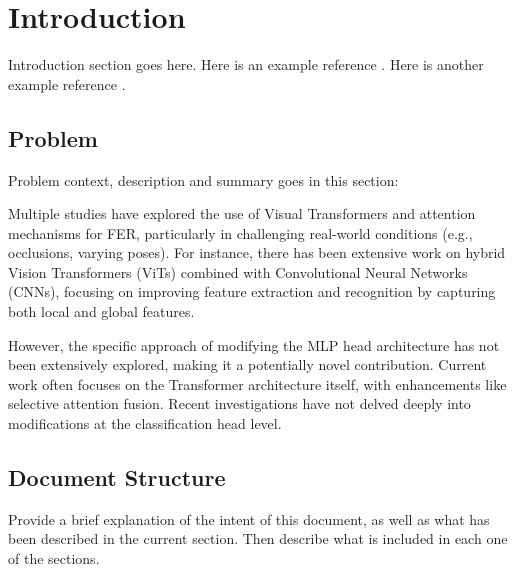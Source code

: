 \chapter{Introduction}
\label{chapter:introduction}


Introduction section goes here. Here is an example reference
\cite{examplereference}. Here is another example reference \cite{examplereference2}.

\newpage

\section{Problem}

Problem context, description and summary goes in this section:

Multiple studies have explored the use of Visual Transformers and attention mechanisms for FER, particularly in challenging real-world conditions (e.g., occlusions, varying poses). For instance, there has been extensive work on hybrid Vision Transformers (ViTs) combined with Convolutional Neural Networks (CNNs), focusing on improving feature extraction and recognition by capturing both local and global features.

However, the specific approach of modifying the MLP head architecture has not been extensively explored, making it a potentially novel contribution. Current work often focuses on the Transformer architecture itself, with enhancements like selective attention fusion. Recent investigations have not delved deeply into modifications at the classification head level.

\section{Document Structure}

Provide a brief explanation of the intent of this document, as well as what has been described in the current section. Then describe what is included in each one of the sections. 



